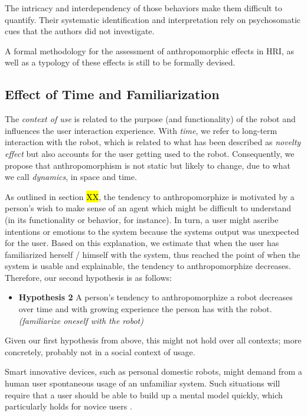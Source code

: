 \documentclass{frontiersSCNS} %
\begin{document}
The intricacy and interdependency of those behaviors make them difficult to
quantify.  Their systematic identification and interpretation rely on
psychosomatic cues that the authors did not investigate.

A formal methodology for the assessment of anthropomorphic effects in HRI, as
well as a typology of these effects is still to be formally devised.

\subsection{Effect of Time and Familiarization}

The \textit{context of use} is related to the purpose (and functionality) of the
robot and influences the user interaction experience. With \textit{time}, we
refer to long-term interaction with the robot, which is related to what has been
described as \textit{novelty effect} but also accounts for the user getting used
to the robot. Consequently, we propose that anthropomorphism is not static but
likely to change, due to what we call \textit{dynamics}, in space and time.


As outlined in section \hl{XX}, the tendency to anthropomorphize is motivated by
a person's wish to make sense of an agent which might be difficult to understand
(in its functionality or behavior, for instance). In turn, a user might ascribe
intentions or emotions to the system because the systems output was unexpected
for the user. Based on this explanation, we estimate that when the user has
familiarized herself / himself with the system, thus reached the point of when
the system is usable and explainable, the tendency to anthropomorphize
decreases. Therefore, our second hypothesis is as follows: 

\begin{itemize}
	\item \textbf{Hypothesis 2} A person's tendency to anthropomorphize a robot decreases over time and with growing experience the person has with the robot. \textit{(familiarize oneself with the robot)}
\end{itemize}	
	

Given our first hypothesis from above, this might not hold over all contexts;
more concretely, probably not in a social context of usage.


Smart innovative devices, such as personal domestic robots, might demand from a
human user spontaneous usage of an unfamiliar system. Such situations will
require that a user should be able to build up a mental model quickly, which
particularly holds for novice users \cite{schmitz_concepts_2011}.
\end{document}
